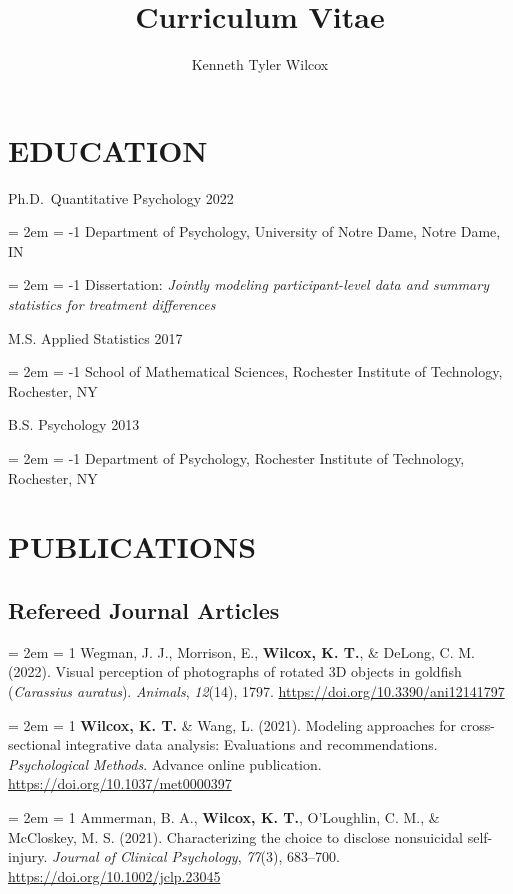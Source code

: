 \documentclass[
  12 pt,
]{article}
\title{Curriculum Vitae}
\author{Kenneth Tyler Wilcox}
\date{}
\begin{document}
\maketitle

\hypertarget{education}{%
\section{EDUCATION}\label{education}}

Ph.D.~Quantitative Psychology \hfill 2022

\hangindent = 2em \hangafter = -1 Department of Psychology, University
of Notre Dame, Notre Dame, IN

\hangindent = 2em \hangafter = -1 Dissertation: \emph{Jointly modeling
participant-level data and summary statistics for treatment differences}

M.S. Applied Statistics \hfill 2017

\hangindent = 2em \hangafter = -1 School of Mathematical Sciences,
Rochester Institute of Technology, Rochester, NY

B.S. Psychology \hfill 2013

\hangindent = 2em \hangafter = -1 Department of Psychology, Rochester
Institute of Technology, Rochester, NY

\hypertarget{publications}{%
\section{PUBLICATIONS}\label{publications}}

\hypertarget{refereed-journal-articles}{%
\subsection{Refereed Journal Articles}\label{refereed-journal-articles}}

\hangindent = 2em \hangafter = 1 Wegman, J. J., Morrison, E.,
\textbf{Wilcox, K. T.}, \& DeLong, C. M. (2022). Visual perception of
photographs of rotated 3D objects in goldfish (\emph{Carassius
auratus}). \emph{Animals}, \emph{12}(14), 1797.
\url{https://doi.org/10.3390/ani12141797}

\hangindent = 2em \hangafter = 1 \textbf{Wilcox, K. T.} \& Wang, L.
(2021). Modeling approaches for cross-sectional integrative data
analysis: Evaluations and recommendations. \emph{Psychological Methods}.
Advance online publication. \url{https://doi.org/10.1037/met0000397}

\hangindent = 2em \hangafter = 1 Ammerman, B. A., \textbf{Wilcox, K.
T.}, O'Loughlin, C. M., \& McCloskey, M. S. (2021). Characterizing the
choice to disclose nonsuicidal self-injury. \emph{Journal of Clinical
Psychology}, \emph{77}(3), 683--700.
\url{https://doi.org/10.1002/jclp.23045}
\end{document}
